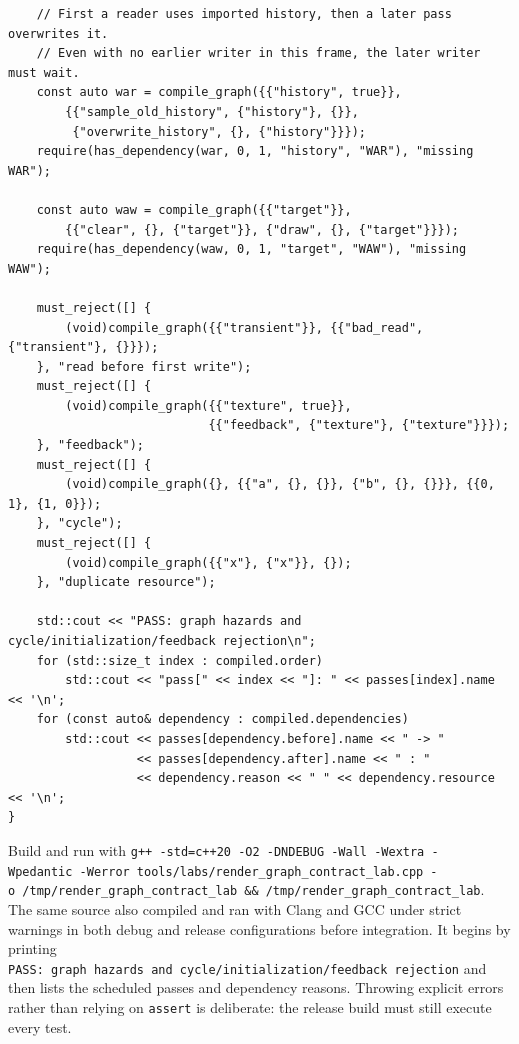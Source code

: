 \begin{verbatim}
    // First a reader uses imported history, then a later pass overwrites it.
    // Even with no earlier writer in this frame, the later writer must wait.
    const auto war = compile_graph({{"history", true}},
        {{"sample_old_history", {"history"}, {}},
         {"overwrite_history", {}, {"history"}}});
    require(has_dependency(war, 0, 1, "history", "WAR"), "missing WAR");

    const auto waw = compile_graph({{"target"}},
        {{"clear", {}, {"target"}}, {"draw", {}, {"target"}}});
    require(has_dependency(waw, 0, 1, "target", "WAW"), "missing WAW");

    must_reject([] {
        (void)compile_graph({{"transient"}}, {{"bad_read", {"transient"}, {}}});
    }, "read before first write");
    must_reject([] {
        (void)compile_graph({{"texture", true}},
                            {{"feedback", {"texture"}, {"texture"}}});
    }, "feedback");
    must_reject([] {
        (void)compile_graph({}, {{"a", {}, {}}, {"b", {}, {}}}, {{0, 1}, {1, 0}});
    }, "cycle");
    must_reject([] {
        (void)compile_graph({{"x"}, {"x"}}, {});
    }, "duplicate resource");

    std::cout << "PASS: graph hazards and cycle/initialization/feedback rejection\n";
    for (std::size_t index : compiled.order)
        std::cout << "pass[" << index << "]: " << passes[index].name << '\n';
    for (const auto& dependency : compiled.dependencies)
        std::cout << passes[dependency.before].name << " -> "
                  << passes[dependency.after].name << " : "
                  << dependency.reason << " " << dependency.resource << '\n';
}
\end{verbatim}

Build and run with \texttt{g++\ -std=c++20\ -O2\ -DNDEBUG\ -Wall\ -Wextra\ -Wpedantic\ -Werror\ tools/labs/render\_graph\_contract\_lab.cpp\ -o\ /tmp/render\_graph\_contract\_lab\ \&\&\ /tmp/render\_graph\_contract\_lab}. The same source also compiled and ran with Clang and GCC under strict warnings in both debug and release configurations before integration. It begins by printing \texttt{PASS:\ graph\ hazards\ and\ cycle/initialization/feedback\ rejection} and then lists the scheduled passes and dependency reasons. Throwing explicit errors rather than relying on \texttt{assert} is deliberate: the release build must still execute every test.

